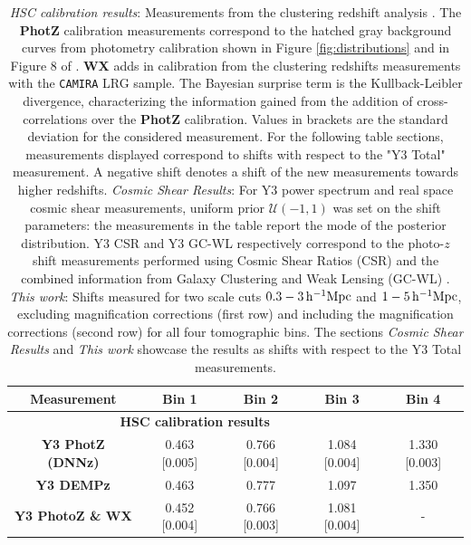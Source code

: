 {\renewcommand{\arraystretch}{1.2}
\begin{table}[h!]
\centering
\caption{\textit{HSC calibration results}: Measurements from the clustering redshift analysis \cite{HSCClusteringRau2023}. The \textbf{PhotZ} calibration measurements correspond to the hatched gray background curves from photometry calibration shown in Figure \ref{fig:distributions} and in Figure 8 of \cite{HSCClusteringRau2023}. \textbf{WX} adds in calibration from the clustering redshifts measurements with the \texttt{CAMIRA} LRG sample. The Bayesian surprise term is the Kullback-Leibler divergence, characterizing the information gained from the addition of cross-correlations over the \textbf{PhotZ} calibration. Values in brackets are the standard deviation for the considered measurement. For the following table sections, measurements displayed correspond to shifts with respect to the "Y3 Total" measurement. A negative shift denotes a shift of the new measurements towards higher redshifts. \textit{Cosmic Shear Results}: For Y3 power spectrum and real space cosmic shear measurements, uniform prior $\mathcal{U}(-1,1)$ was set on the shift parameters: the measurements in the table report the mode of the posterior distribution. Y3 CSR and Y3 GC-WL respectively correspond to the photo-$z$ shift measurements performed using Cosmic Shear Ratios (CSR) \cite{Rana2025HSCY3CosmicShearRatios} and the combined information from Galaxy Clustering and Weak Lensing (GC-WL) \cite{Zhang2025RedshiftGCPointMass}. \textit{This work}: Shifts measured for two scale cuts $0.3-3\,\mathrm{h}^{-1}\mathrm{Mpc}$ and $1-5\,\mathrm{h}^{-1}\mathrm{Mpc}$, excluding magnification corrections (first row) and including the magnification corrections (second row) for all four tomographic bins. The sections \textit{Cosmic Shear Results} and \textit{This work} showcase the results as shifts with respect to the Y3 Total measurements.}
\begin{tabular}{c|c|c|c|c}
\textbf{Measurement} & \textbf{Bin 1} & \textbf{Bin 2} & \textbf{Bin 3} & \textbf{Bin 4} \\
\hline
\multicolumn{4}{c}{\textbf{HSC calibration results \cite{HSCClusteringRau2023}}} \\ \hline
\textbf{Y3 PhotZ (DNNz)} & 0.463 [0.005] & 0.766 [0.004] & 1.084 [0.004] & 1.330 [0.003] \\
\textbf{Y3 DEMPz} & 0.463 & 0.777 & 1.097 & 1.350 \\
\textbf{Y3 PhotoZ \& WX} & 0.452 [0.004] & 0.766 [0.003] & 1.081 [0.004] & - \\

\end{tabular}
\end{table}}
